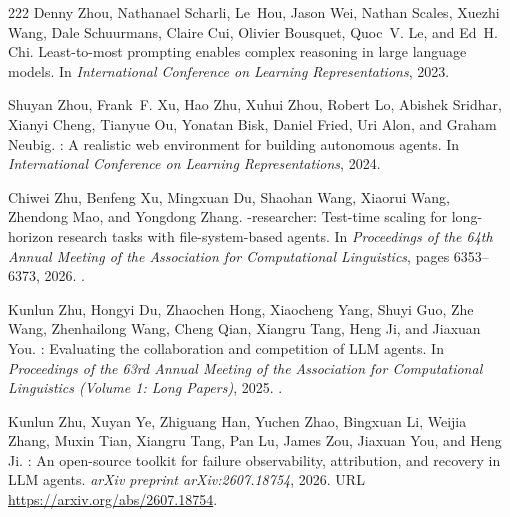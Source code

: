 \begin{thebibliography}{222}
Denny Zhou, Nathanael Scharli, Le~Hou, Jason Wei, Nathan Scales, Xuezhi Wang,
  Dale Schuurmans, Claire Cui, Olivier Bousquet, Quoc~V. Le, and Ed~H. Chi.
\newblock Least-to-most prompting enables complex reasoning in large language
  models.
\newblock In \emph{International Conference on Learning Representations}, 2023.

Shuyan Zhou, Frank~F. Xu, Hao Zhu, Xuhui Zhou, Robert Lo, Abishek Sridhar,
  Xianyi Cheng, Tianyue Ou, Yonatan Bisk, Daniel Fried, Uri Alon, and Graham
  Neubig.
: A realistic web environment for building autonomous
  agents.
\newblock In \emph{International Conference on Learning Representations}, 2024.

Chiwei Zhu, Benfeng Xu, Mingxuan Du, Shaohan Wang, Xiaorui Wang, Zhendong Mao,
  and Yongdong Zhang.
-researcher: Test-time scaling for long-horizon research tasks
  with file-system-based agents.
\newblock In \emph{Proceedings of the 64th Annual Meeting of the Association
  for Computational Linguistics}, pages 6353--6373, 2026{}.
\newblock {}.

Kunlun Zhu, Hongyi Du, Zhaochen Hong, Xiaocheng Yang, Shuyi Guo, Zhe Wang,
  Zhenhailong Wang, Cheng Qian, Xiangru Tang, Heng Ji, and Jiaxuan You.
: Evaluating the collaboration and competition of
  {LLM} agents.
\newblock In \emph{Proceedings of the 63rd Annual Meeting of the Association
  for Computational Linguistics (Volume 1: Long Papers)}, 2025.
\newblock {}.

Kunlun Zhu, Xuyan Ye, Zhiguang Han, Yuchen Zhao, Bingxuan Li, Weijia Zhang,
  Muxin Tian, Xiangru Tang, Pan Lu, James Zou, Jiaxuan You, and Heng Ji.
: An open-source toolkit for failure observability,
  attribution, and recovery in {LLM} agents.
\newblock \emph{arXiv preprint arXiv:2607.18754}, 2026{}.
\newblock URL \url{https://arxiv.org/abs/2607.18754}.

\end{thebibliography}
